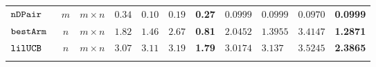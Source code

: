 {\begin {table}[t]
\begin{center}
{\begin{tabular}{|| >{\tiny}l || c | c || c | l | c | r || c | l | c | r || }
        \hhline{||-||---||-||--||----||}
        $\mathtt{nDPair}$~\cite{Jamieson2015TheAO} & $ m $ & $  m \times n  $   & $0.34$  & $0.10$ & $0.19$ & \textbf{0.27} & $0.0999$   & $0.0999$ & $0.0970$ & \textbf{0.0999}   \\
        \hhline{||-||---||-||--||----||}
        $\mathtt{bestArm}$~\cite{Jamieson2015TheAO} & $ n $ & $  m \times n $  & $1.82$  & $1.46$ & $2.67$ & \textbf{0.81}& $ 2.0452$   & $ 1.3955$ & {{$3.4147$}} & \textbf{1.2871} \\
        \hhline{||-||---||-||--||----||}
        $\mathtt{lilUCB}$~\cite{Jamieson2015TheAO} & $ n $ & $ m \times n $ & $3.07$  & $3.11$ & $3.19$ & \textbf{1.79}& $3.0174$   & $ 3.137$ & {$3.5245$} & \textbf{2.3865}   \\
        \hhline{|:t=========== t:|}
\end{tabular}
}
\end{center}
\vspace{-0.8cm}
\end{table}
}




